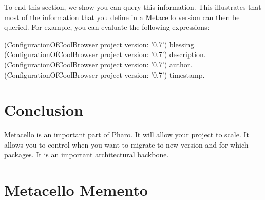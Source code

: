 \documentclass[a4paper,10pt,twoside]{book}
\begin{document}
To end this section, we show you can query this information. This illustrates that most of the information that you define in a Metacello version can then be queried. For example, you can evaluate the following expressions:

\begin{code}{}
(ConfigurationOfCoolBrowser project version: '0.7') blessing.
(ConfigurationOfCoolBrowser project version: '0.7') description.
(ConfigurationOfCoolBrowser project version: '0.7') author.
(ConfigurationOfCoolBrowser project version: '0.7') timestamp.
\end{code}


\section{Conclusion}
Metacello is an important part of Pharo. It will allow your project to scale. It allows you to control when you want to migrate to new version and for which packages. It is an important architectural backbone.


\newpage

\section{Metacello Memento}
\end{document}
